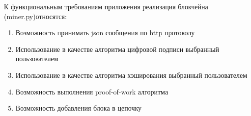 К функциональным требованиям приложения реализация блокчейна ({\small miner.py})относятся:
\begin{enumerate}
    \item Возможность принимать json сообщения по http протоколу
    \item Использование в качестве алгоритма цифровой подписи выбранный пользователем
    \item Использование в качестве алгоритма хэширования выбранный пользователем
    \item Возможность выполнения proof-of-work алгоритма
    \item Возможность добавления блока в цепочку
\end{enumerate}
